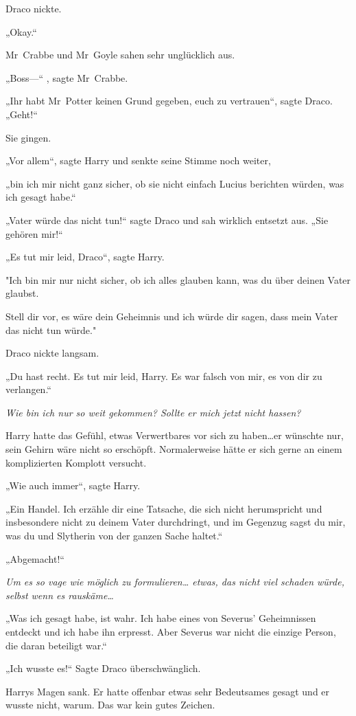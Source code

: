 {Draco nickte.

„Okay.“

Mr~Crabbe und Mr~Goyle sahen sehr unglücklich aus.

„Boss—“ , sagte Mr~Crabbe.

„Ihr habt Mr~Potter keinen Grund gegeben, euch zu vertrauen“, sagte Draco. „Geht!“

Sie gingen.

„Vor allem“, sagte Harry und senkte seine Stimme noch weiter,

„bin ich mir nicht ganz sicher, ob sie nicht einfach Lucius berichten würden, was ich gesagt habe.“

„Vater würde das nicht tun!“ sagte Draco und sah wirklich entsetzt aus. „Sie gehören mir!“

„Es tut mir leid, Draco“, sagte Harry.

"Ich bin mir nur nicht sicher, ob ich alles glauben kann, was du über deinen Vater glaubst.

Stell dir vor, es wäre dein Geheimnis und ich würde dir sagen, dass mein Vater das nicht tun würde."

Draco nickte langsam.

„Du hast recht. Es tut mir leid, Harry. Es war falsch von mir, es von dir zu verlangen.“

\emph{Wie bin ich nur so weit gekommen? Sollte er mich jetzt nicht hassen?}

Harry hatte das Gefühl, etwas Verwertbares vor sich zu haben…er wünschte nur, sein Gehirn wäre nicht so erschöpft. Normalerweise hätte er sich gerne an einem komplizierten Komplott versucht.

„Wie auch immer“, sagte Harry.

„Ein Handel. Ich erzähle dir eine Tatsache, die sich nicht herumspricht und insbesondere nicht zu deinem Vater durchdringt, und im Gegenzug sagst du mir, was du und Slytherin von der ganzen Sache haltet.“

„Abgemacht!“

\emph{Um es so vage wie möglich zu formulieren… etwas, das nicht viel schaden würde, selbst wenn es rauskäme…}

„Was ich gesagt habe, ist wahr. Ich habe eines von Severus' Geheimnissen entdeckt und ich habe ihn erpresst. Aber Severus war nicht die einzige Person, die daran beteiligt war.“

„Ich wusste es!“ Sagte Draco überschwänglich.

Harrys Magen sank. Er hatte offenbar etwas sehr Bedeutsames gesagt und er wusste nicht, warum. Das war kein gutes Zeichen.

}
